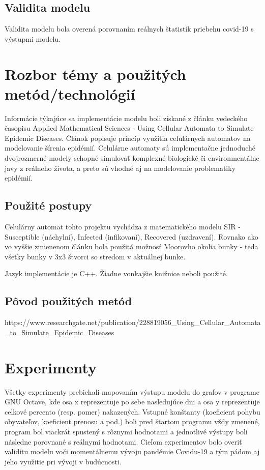 \documentclass[11pt,a4paper,titlepage]{article}
\begin{document}
\subsection{Validita modelu}
Validita modelu bola overená porovnaním reálnych štatistík priebehu covid-19 s výstupmi modelu. 

\section{Rozbor témy a použitých metód/technológií}
Informácie týkajúce sa implementácie modelu boli získané z článku vedeckého časopisu Applied Mathematical Sciences - Using Cellular Automata to Simulate Epidemic Diseases.\cite{Zdroj}
Článok popisuje princíp využitia celulárnych automatov na modelovanie šírenia epidémií. Celulárne automaty sú implementačne jednoduché dvojrozmerné modely schopné simulovať komplexné biologické či environmentálne javy z reálneho života, a preto sú vhodné aj na modelovanie problematiky epidémií.

\subsection{Použité postupy}
Celulárny automat tohto projektu vychádza z matematického modelu SIR - Susceptible (náchylní), Infected (infikovaní), Recovered (uzdravení). Rovnako ako vo vyššie zmienenom článku bola použitá možnosť Moorovho okolia bunky - teda všetky bunky v 3x3 štvorci so stredom v aktuálnej bunke.

Jazyk implementácie je C++. Žiadne vonkajšie knižnice neboli použité.

\subsection{Pôvod použitých metód}
https://www.researchgate.net/publication/228819056\_Using\_Cellular\_Automata\_to\_Simulate\_Epidemic\_Diseases

\section{Experimenty}
Všetky experimenty prebiehali mapovaním výstupu modelu do grafov v programe GNU Octave, kde osa x reprezentuje po sebe nasledujúce dni a osa y reprezentuje celkové percento (resp. pomer) nakazených. Vstupné konštanty (koeficient pohybu obyvateľov, koeficient prenosu a pod.) boli pred štartom programu vždy zmenené, program bol viackrát spustený s rôznymi hodnotami a jednotlivé výstupy boli následne porovnané s reálnymi hodnotami. Cieľom experimentov bolo overiť validitu modelu voči momentálnemu vývoju pandémie Covidu-19 a tým pádom aj jeho využitie pri vývoji v budúcnosti.
\end{document}
